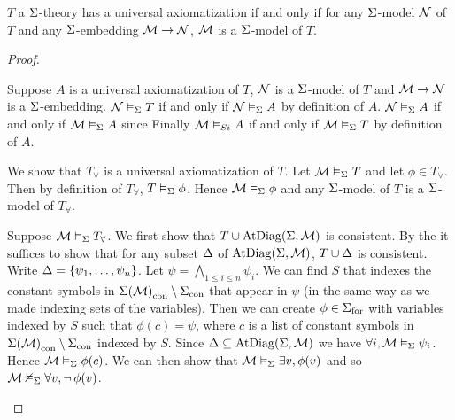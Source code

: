 \begin{prop}
    $T$ a $\Sigma$-theory has a universal axiomatization if and only if
    for any $\Sigma$-model $\mathcal{N}$ of $T$ and any $\Sigma$-embedding $\mathcal{M} \to \mathcal{N}$,
    $\mathcal{M}$ is a $\Sigma$-model of $T$.
\end{prop}
\begin{proof}
    \begin{forward}
        Suppose $A$ is a universal axiomatization of $T$,
        $\mathcal{N}$ is a $\Sigma$-model of $T$ and $\mathcal{M} \to \mathcal{N}$ is a 
        $\Sigma$-embedding.
        $\mathcal{N} \vDash_{\Sigma} T$ if and only if $\mathcal{N} \vDash_{\Sigma} A$
        by definition of $A$.
        $\mathcal{N} \vDash_{\Sigma} A$ if and only if $\mathcal{M} \vDash_{\Sigma} A$
        since 
        Finally $\mathcal{M} \vDash_{Si} A$ if and only if $\mathcal{M} \vDash_{\Sigma} T$
        by definition of $A$.
    \end{forward}

    \begin{backward}
        We show that $T_\forall$ is a universal axiomatization of $T$.
        Let $\mathcal{M} \vDash_{\Sigma} T$ and let $\phi \in T_\forall$.
        Then by definition of $T_\forall$, $T \vDash_{\Sigma} \phi$.
        Hence $\mathcal{M} \vDash_{\Sigma} \phi$ and any $\Sigma$-model of $T$ is
        a $\Sigma$-model of $T_\forall$.

        Suppose $\mathcal{M} \vDash_{\Sigma} T_\forall$.
        We first show that $T \cup \mathrm{AtDiag}(\Sigma,\mathcal{M})$ is consistent.
        By the  
        it suffices to show that for any subset 
        $\Delta$ of $\mathrm{AtDiag}(\Sigma,\mathcal{M})$,
        $T \cup \Delta$ is consistent.
        Write $\Delta  = \left\{\psi_1, \dots, \psi_n\right\}$.
        Let $\psi = \bigwedge_{1 \leq i \leq n} \psi_i$.
        We can find $S$ that indexes the constant symbols in 
        ${\Sigma(\mathcal{M})}_\mathrm{con} \setminus {\Sigma}_\mathrm{con}$ that appear in $\psi$ 
        (in the same way as we made indexing sets of the variables).
        Then we can create $\phi \in {\Sigma}_\mathrm{for}$ 
        with variables indexed by $S$ such that 
        $\phi(c) = \psi$, 
        where $c$ is a list of constant symbols in 
        ${\Sigma(\mathcal{M})}_\mathrm{con} \setminus {\Sigma}_\mathrm{con}$ indexed by $S$.
        Since $\Delta \subseteq \mathrm{AtDiag}(\Sigma,\mathcal{M})$ we have
        $\forall i, \mathcal{M} \vDash_{\Sigma} \psi_i$.
        Hence $\mathcal{M} \vDash_{\Sigma} \phi(c)$.
        We can then show that $\mathcal{M} \vDash_{\Sigma} \exists v,  \phi(v)$ and so
        $\mathcal{M} \nvDash_{\Sigma} \forall v,  \neg\, \phi(v)$.


\end{backward}
\end{proof}
